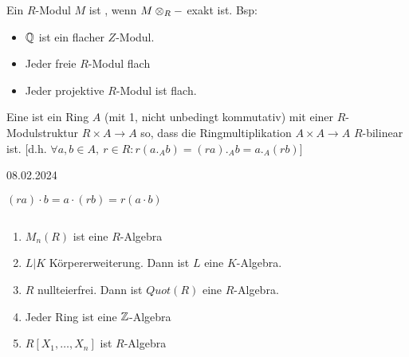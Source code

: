 \documentclass[../main.tex]{subfiles}
\begin{document}
Ein $R$-Modul $M$ ist , wenn $M\otimes_R -$ exakt ist.
Bsp: 
\begin{itemize}[noitemsep]
    \item $\mathbb{Q}$ ist ein flacher $Z$-Modul.
    \item Jeder freie $R$-Modul flach
    \item Jeder projektive $R$-Modul ist flach.
\end{itemize}

\begin{definition}
    Eine  ist ein Ring $A$ (mit 1, nicht unbedingt kommutativ) mit einer $R$-Modulstruktur $R\times A \rightarrow A$ so, dass die Ringmultiplikation $A\times A\rightarrow A$ $R$-bilinear ist.
    [d.h. $\forall a,b\in A,\ r\in R: r(a._Ab) = (ra)._A b = a._A(rb)$]
\end{definition}
\begin{flushright}
    08.02.2024
\end{flushright}
\begin{minipage}{0.3\textwidth}
    $(ra)\cdot b = a\cdot (rb) = r(a\cdot b)$
\end{minipage}
\begin{example}$ $
    \begin{enumerate}[label=(\roman*)]
        \item $M_n (R)$ ist eine $R$-Algebra
        \item $L|K$ Körpererweiterung. Dann ist $L$ eine $K$-Algebra.
        \item $R$ nullteierfrei. Dann ist $Quot(R)$ eine $R$-Algebra.
        \item Jeder Ring ist eine $\mathbb{Z}$-Algebra
        \item $R[X_1,\dots,X_n]$ ist $R$-Algebra
    \end{enumerate}
\end{example}
\end{document}
